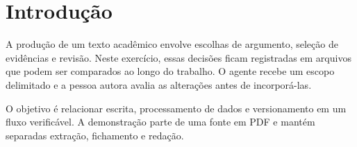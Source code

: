 \chapter{Introdução}
A produção de um texto acadêmico envolve escolhas de argumento, seleção de evidências e revisão. Neste exercício, essas decisões ficam registradas em arquivos que podem ser comparados ao longo do trabalho. O agente recebe um escopo delimitado e a pessoa autora avalia as alterações antes de incorporá-las.

O objetivo é relacionar escrita, processamento de dados e versionamento em um fluxo verificável. A demonstração parte de uma fonte em PDF e mantém separadas extração, fichamento e redação.
